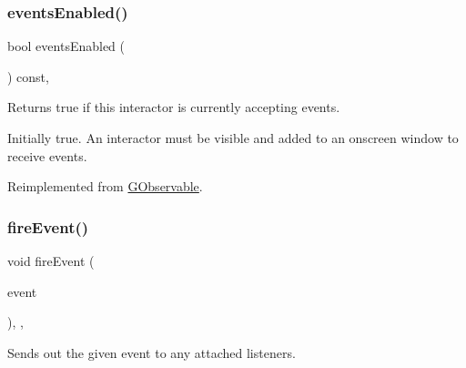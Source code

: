 \mbox{\label{classGInteractor_ac05ba5b92e2e5146d416fe7f842a0969}} 
\subsubsection{\texorpdfstring{events\+Enabled()}{eventsEnabled()}}
{\footnotesize\ttfamily bool events\+Enabled (\begin{DoxyParamCaption}{ }\end{DoxyParamCaption}) const\hspace{0.3cm}{\ttfamily [virtual]}, {\ttfamily [inherited]}}



Returns true if this interactor is currently accepting events. 

Initially true. An interactor must be visible and added to an onscreen window to receive events. 

Reimplemented from \mbox{\hyperlink{classGObservable_a8ebb3da91032e7f4c34485dabc518b8a}{G\+Observable}}.

\mbox{\label{classGObservable_a63e5e5a6227c59c928493b11aceb0f67}} 
\subsubsection{\texorpdfstring{fire\+Event()}{fireEvent()}}
{\footnotesize\ttfamily void fire\+Event (\begin{DoxyParamCaption}\item[{\mbox{\hyperlink{classGEvent}{G\+Event}} \&}]{event }\end{DoxyParamCaption})\hspace{0.3cm}{\ttfamily [protected]}, {\ttfamily [virtual]}, {\ttfamily [inherited]}}



Sends out the given event to any attached listeners. 

\mbox{\label{classGObservable_ab3983ea07337b52020a29cc00c653d8d}} 
